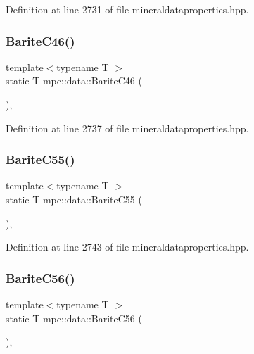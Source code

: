 Definition at line 2731 of file mineraldataproperties.\+hpp.

\mbox{\label{namespacempc_1_1data_adba18f3b7a7f0cc4b67913d2b6ec0525}} 
\subsubsection{\texorpdfstring{Barite\+C46()}{BariteC46()}}
{\footnotesize\ttfamily template$<$typename T $>$ \\
static T mpc\+::data\+::\+Barite\+C46 (\begin{DoxyParamCaption}{ }\end{DoxyParamCaption})\hspace{0.3cm}{\ttfamily [inline]}, {\ttfamily [static]}}



Definition at line 2737 of file mineraldataproperties.\+hpp.

\mbox{\label{namespacempc_1_1data_a715fea7ff514bedfe0a4af3999b867cf}} 
\subsubsection{\texorpdfstring{Barite\+C55()}{BariteC55()}}
{\footnotesize\ttfamily template$<$typename T $>$ \\
static T mpc\+::data\+::\+Barite\+C55 (\begin{DoxyParamCaption}{ }\end{DoxyParamCaption})\hspace{0.3cm}{\ttfamily [inline]}, {\ttfamily [static]}}



Definition at line 2743 of file mineraldataproperties.\+hpp.

\mbox{\label{namespacempc_1_1data_ae6b440901e6b5234e7eeb9021c542042}} 
\subsubsection{\texorpdfstring{Barite\+C56()}{BariteC56()}}
{\footnotesize\ttfamily template$<$typename T $>$ \\
static T mpc\+::data\+::\+Barite\+C56 (\begin{DoxyParamCaption}{ }\end{DoxyParamCaption})\hspace{0.3cm}{\ttfamily [inline]}, {\ttfamily [static]}}



